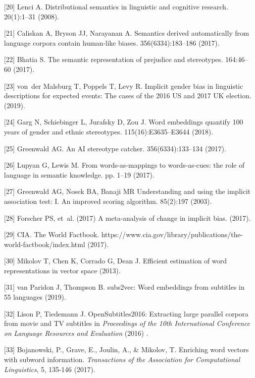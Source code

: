 \documentclass[9pt,twocolumn]{pnas-new}
\begin{document}
[20] Lenci A. Distributional semantics in linguistic and cognitive research.
 20(1):1--31  (2008).

[21] Caliskan A, Bryson JJ, Narayanan A. Semantics derived automatically from
  language corpora contain human-like biases.
 356(6334):183--186 (2017).

[22] Bhatia S. The semantic representation of prejudice and stereotypes.
 164:46--60 (2017).

[23] von~der Malsburg T, Poppels T, Levy R. Implicit gender bias in linguistic
  descriptions for expected events: The cases of the 2016 {US} and 2017 {UK}
  election.
 (2019).

[24] Garg N, Schiebinger L, Jurafsky D, Zou J. Word embeddings quantify 100
  years of gender and ethnic stereotypes.
  115(16):E3635--E3644 (2018).

[25] Greenwald AG. An {AI} stereotype catcher.
 356(6334):133--134  (2017).

[26] Lupyan G, Lewis M. From words-as-mappings to words-as-cues: the role of
  language in semantic knowledge.
 pp. 1--19 (2017).

[27] Greenwald AG, Nosek BA, Banaji MR  Understanding and using the implicit
  association test: I. {A}n improved scoring algorithm.
 85(2):197 (2003).

[28] Forscher PS, et~al. (2017) A meta-analysis of change in implicit bias.
 (2017).

[29] {CIA}. The {W}orld {F}actbook.
\newblock
  https://www.cia.gov/library/publications/the-world-factbook/index.html (2017).

[30] Mikolov T, Chen K, Corrado G, Dean J. Efficient estimation of word
  representations in vector space  (2013).

[31] van Paridon J, Thompson B. subs2vec: Word embeddings from subtitles in 55
  languages (2019).

[32] Lison P, Tiedemann J. {OpenSubtitles201}6: Extracting large parallel
  corpora from movie and {TV} subtitles in {\em Proceedings of the 10th
  {I}nternational {C}onference on {L}anguage {R}esources and {E}valuation} (2016) .

[33] Bojanowski, P., Grave, E., Joulin, A., \& Mikolov, T.  Enriching word vectors with subword information. {\em Transactions of the Association for Computational Linguistics}, 5, 135-146 (2017).
\end{document}
